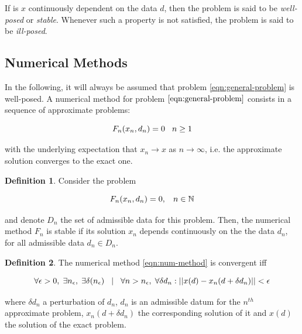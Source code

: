 \documentclass[11pt]{article}
\theoremstyle{theorem}
\theoremstyle{definition}
\newtheorem{definition}{Definition}
\begin{document}
If is $x$ continuously dependent on the data $d$, then the problem is said to be \emph{well-posed} or \emph{stable}. Whenever such a property is not satisfied, the problem is said to be \emph{ill-posed}.\\

\subsection{Numerical Methods}
In the following, it will always be assumed that problem \eqref{eqn:general-problem} is well-posed. A numerical method for problem $\eqref{eqn:general-problem}$ consists in a sequence of approximate problems:

\begin{equation}
	\label{eqn:num-method}
	F_n(x_n, d_n) = 0 \hspace{3mm} n\ge 1
\end{equation}

with the underlying expectation that $x_n\rightarrow x$ as $n\rightarrow\infty$, i.e. the approximate solution converges to the exact one. 

\begin{definition}
	\label{defn:stability}
	Consider the problem 
	
	$$F_n(x_n, d_n)=0, \hspace{3mm} n\in\mathbb{N}$$
	
	and denote $D_n$ the set of admissible data for this problem. Then, the numerical method $F_n$ is stable if its solution $x_n$ depends continuously on the the data $d_n$, for all admissible data $d_n\in D_n$.
\end{definition}

\begin{definition}
	\label{defn:convergence}
The numerical method \eqref{eqn:num-method} is convergent iff

$$\forall\epsilon >0,\hspace{1mm} \exists n_\epsilon,\hspace{1mm} \exists\delta(n_\epsilon)\hspace{3mm} | \hspace{3mm}\forall n > n_\epsilon,\hspace{1mm} \forall\delta d_n : ||x(d)-x_n(d+\delta d_n)||<\epsilon$$

where $\delta d_n$ a perturbation of $d_n$, $d_n$ is an admissible datum for the $n^{th}$ approximate problem,  $x_n(d+\delta d_n)$ the corresponding solution of it and $x(d)$ the solution of the exact problem.
\end{definition}
\end{document}

